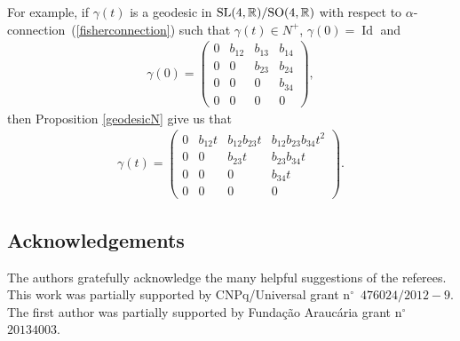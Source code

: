 \documentclass[pdftex]{sigma}
\numberwithin{equation}{section}
\begin{document}
\begin{Remark}
  For example, if $\gamma(t)$ is a geodesic in ${\rm SL}(4,{\mathbb R})/{\rm SO}(4,{\mathbb R})$ with respect to $\alpha$-con\-nec\-tion~(\ref{fisherconnection}) such that $\gamma(t) \in N^+$, $\gamma(0) = \operatorname{Id}$ and
  \begin{gather*}
    \gamma(0) =
    \left(
    \begin{matrix}
      0      & b_{12} & b_{13} & b_{14} \\
      0      &   0    & b_{23} & b_{24}\\
      0      &   0    &   0    & b_{34}\\
      0      &   0    &   0    & 0
    \end{matrix}
    \right),
  \end{gather*}
  then Proposition \ref{geodesicN} give us that
  \begin{gather*}
    \gamma(t) =
    \left(
    \begin{matrix}
      0      & b_{12}t & b_{12}b_{23}t & b_{12}b_{23}b_{34}t^2 \\
      0      &   0    & b_{23}t & b_{23}b_{34}t\\
      0      &   0    &   0    & b_{34}t\\
      0      &   0    &   0    & 0
    \end{matrix}
    \right).
  \end{gather*}
\end{Remark}

\vspace{-3.5mm}

\subsection*{Acknowledgements}

\vspace{-1mm}

The authors gratefully acknowledge the many helpful suggestions of
the referees.
This work was partially supported by CNPq/Universal grant
n$^{\circ}$~$476024/2012{-}9$. The f\/irst author was partially
supported by Funda\c{c}\~{a}o Arauc\'{a}ria grant  n$^{\circ}$~$20134003$.

\vspace{-2.5mm}
\end{document}
